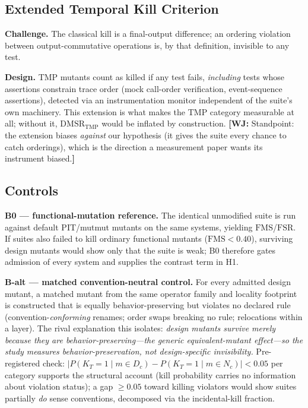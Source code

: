 \documentclass[conference]{IEEEtran}
\newcommand{\wj}[1]{{\color{blue}\footnotesize\textbf{[WJ:} #1\textbf{]}}}
\newcommand{\dmsr}{\mathrm{DMSR}}
\newcommand{\fsr}{\mathrm{FSR}}
\newcommand{\fms}{\mathrm{FMS}}
\begin{document}
\subsection{Extended Temporal Kill Criterion}\label{sec:tmp-kill}

\textbf{Challenge.} The classical kill is a final-output difference; an ordering violation between output-commutative operations is, by that definition, invisible to any test.

\textbf{Design.} TMP mutants count as killed if any test fails, \emph{including} tests whose assertions constrain trace order (mock call-order verification, event-sequence assertions), detected via an instrumentation monitor independent of the suite's own machinery. This extension is what makes the TMP category measurable at all; without it, $\dmsr_{\mathrm{TMP}}$ would be inflated by construction. \wj{Standpoint: the extension biases \emph{against} our hypothesis (it gives the suite every chance to catch orderings), which is the direction a measurement paper wants its instrument biased.}

\subsection{Controls}\label{sec:controls}

\textbf{B0 --- functional-mutation reference.} The identical unmodified suite is run against default PIT/mutmut mutants on the same systems, yielding $\fms$/$\fsr$. If suites also failed to kill ordinary functional mutants ($\fms < 0.40$), surviving design mutants would show only that the suite is weak; B0 therefore gates admission of every system and supplies the contrast term in H1.

\textbf{B-alt --- matched convention-neutral control.} For every admitted design mutant, a matched mutant from the same operator family and locality footprint is constructed that is equally behavior-preserving but violates no declared rule (convention-\emph{conforming} renames; order swaps breaking no rule; relocations within a layer). The rival explanation this isolates: \emph{design mutants survive merely because they are behavior-preserving---the generic equivalent-mutant effect---so the study measures behavior-preservation, not design-specific invisibility.} Pre-registered check: $|P(K_T{=}1 \mid m \in D_c) - P(K_T{=}1 \mid m \in N_c)| < 0.05$ per category supports the structural account (kill probability carries no information about violation status); a gap $\geq 0.05$ toward killing violators would show suites partially \emph{do} sense conventions, decomposed via the incidental-kill fraction.
\end{document}
